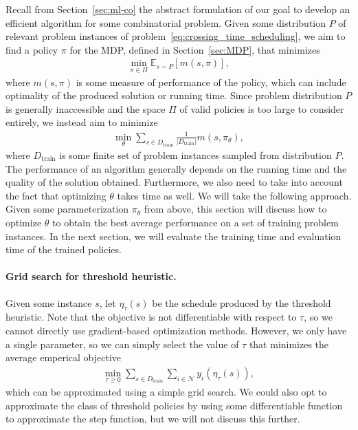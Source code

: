 \documentclass[a4paper]{report}
\theoremstyle{definition}
\theoremstyle{plain}
\begin{document}
Recall from Section~\ref{sec:ml-co} the abstract formulation of our goal to
develop an efficient algorithm for some combinatorial problem. Given some
distribution $P$ of relevant problem instances of
problem~\eqref{eq:crossing_time_scheduling}, we aim to find a policy $\pi$ for
the MDP, defined in Section~\ref{sec:MDP}, that minimizes
\begin{align*}
  \min_{\pi \in \Pi} \mathbb{E}_{s \sim P} [m(s,\pi)] ,
\end{align*}
where $m(s, \pi)$ is some measure of performance of the policy, which can
include optimality of the produced solution or running time.
%
Since problem distribution $P$ is generally inaccessible and the space $\Pi$ of
valid policies is too large to consider entirely, we instead aim to minimize
\begin{align}
  \min_{\theta} \sum_{s \in D_\text{train}} \frac{1}{|D_\text{train}|} m(s, \pi_\theta) ,
\end{align}
where $D_\text{train}$ is some finite set of problem instances sampled from
distribution $P$.
%
The performance of an algorithm generally depends on the running time and the
quality of the solution obtained.
%
Furthermore, we also need to take into account the fact that optimizing $\theta$
takes time as well.
%
We will take the following approach.
%
Given some parameterization $\pi_\theta$ from above, this section will discuss how to optimize $\theta$ to obtain the best average performance on a set of training problem instances.
%
In the next section, we will evaluate the training time and evaluation time of
the trained policies.


\paragraph{Grid search for threshold heuristic.}
Given some instance $s$, let $\eta_{\tau}(s)$ be the schedule produced by the
threshold heuristic. Note that the objective is not differentiable with respect
to $\tau$, so we cannot directly use gradient-based optimization methods. However,
we only have a single parameter, so we can simply select the value of $\tau$ that
minimizes the average emperical objective
%
\begin{align}
  \min_{\tau \geq 0} \sum_{s \in D_\text{train}} \sum_{i \in \mathcal{N}} y_i(\eta_{\tau}(s)) ,
\end{align}
%
which can be approximated using a simple grid search.
%
We could also opt to approximate the class of threshold policies by using some
differentiable function to approximate the step function, but we will not
discuss this further.
\end{document}
